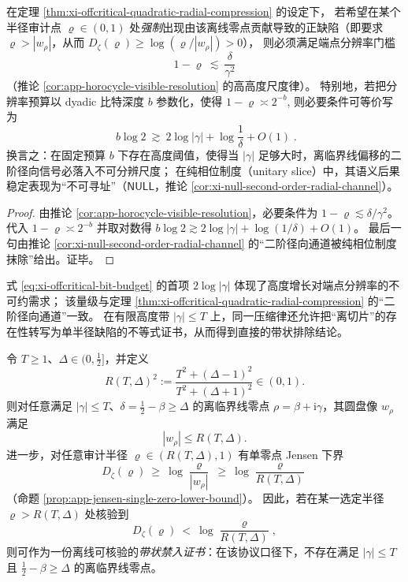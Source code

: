 \label{subsec:xi-certificate-coherence-orthogonal-axis-capacity-part3}

\begin{corollary}\label{cor:xi-offcritical-visibility-threshold-bit-budget}
在定理 \ref{thm:xi-offcritical-quadratic-radial-compression} 的设定下，
若希望在某个半径审计点 \(\varrho\in(0,1)\) 处\emph{强制}出现由该离线零点贡献导致的正缺陷（即要求 \(\varrho>|w_\rho|\)，从而 \(D_\zeta(\varrho)\ge \log(\varrho/|w_\rho|)>0\)），
则必须满足端点分辨率门槛
\[
1-\varrho\ \lesssim\ \frac{\delta}{\gamma^2}
\]
（推论 \ref{cor:app-horocycle-visible-resolution} 的高高度尺度律）。
特别地，若把分辨率预算以 dyadic 比特深度 \(b\) 参数化，使得
\(
1-\varrho\asymp 2^{-b}
\),
则必要条件可等价写为
\begin{equation}\label{eq:xi-offcritical-bit-budget}
\boxed{\;
b\log 2\ \gtrsim\ 2\log|\gamma|+\log\frac{1}{\delta}+O(1)\; }.
\end{equation}
换言之：在固定预算 \(b\) 下存在高度阈值，使得当 \(|\gamma|\) 足够大时，离临界线偏移的二阶径向信号必落入不可分辨尺度；
在纯相位制度（unitary slice）中，其语义后果稳定表现为“不可寻址”（\(\mathsf{NULL}\)，推论 \ref{cor:xi-null-second-order-radial-channel}）。
\end{corollary}

\begin{proof}
由推论 \ref{cor:app-horocycle-visible-resolution}，必要条件为 \(1-\varrho\lesssim \delta/\gamma^2\)。
代入 \(1-\varrho\asymp 2^{-b}\) 并取对数得
\(
b\log 2\gtrsim 2\log|\gamma|+\log(1/\delta)+O(1)
\)。
最后一句由推论 \ref{cor:xi-null-second-order-radial-channel} 的“二阶径向通道被纯相位制度抹除”给出。证毕。
\end{proof}

式 \eqref{eq:xi-offcritical-bit-budget} 的首项 \(2\log|\gamma|\) 体现了高度增长对端点分辨率的不可约需求；
该量级与定理 \ref{thm:xi-offcritical-quadratic-radial-compression} 的“二阶径向通道”一致。
在有限高度带 \(|\gamma|\le T\) 上，同一压缩律还允许把“离切片”的存在性转写为单半径缺陷的不等式证书，从而得到直接的带状排除结论。

\begin{theorem}\label{thm:xi-jensen-single-radius-band-exclusion}
令 \(T\ge 1\)、\(\Delta\in(0,\tfrac12]\)，并定义
\[
  R(T,\Delta)^2:=\frac{T^2+(\Delta-1)^2}{T^2+(\Delta+1)^2}\in(0,1).
\]
则对任意满足 \(|\gamma|\le T\)、\(\delta=\tfrac12-\beta\ge\Delta\) 的离临界线零点 \(\rho=\beta+\mathrm{i}\gamma\)，其圆盘像 \(w_\rho\) 满足
\[
  |w_\rho|\le R(T,\Delta).
\]
进一步，对任意审计半径 \(\varrho\in(R(T,\Delta),1)\) 有单零点 Jensen 下界
\[
  D_\zeta(\varrho)\ \ge\ \log\frac{\varrho}{|w_\rho|}\ \ge\ \log\frac{\varrho}{R(T,\Delta)}
\]
（命题 \ref{prop:app-jensen-single-zero-lower-bound}）。
因此，若在某一选定半径 \(\varrho>R(T,\Delta)\) 处核验到
\[
  D_\zeta(\varrho)\ <\ \log\frac{\varrho}{R(T,\Delta)},
\]
则可作为一份离线可核验的\emph{带状禁入证书}：在该协议口径下，不存在满足 \(|\gamma|\le T\) 且 \(\tfrac12-\beta\ge\Delta\) 的离临界线零点。
\end{theorem}


